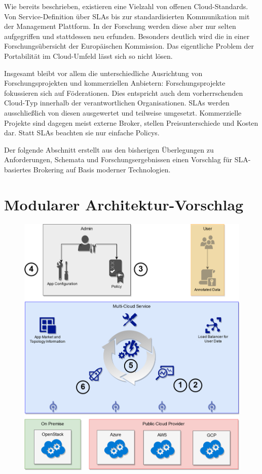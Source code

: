 Wie bereits beschrieben, existieren eine Vielzahl von offenen Cloud-Standards. Von Service-Definition über SLAs bis zur standardisierten Kommunikation mit der Management Plattform. In der Forschung werden diese aber nur selten aufgegriffen und stattdessen neu erfunden. Besonders deutlich wird die in einer Forschungsübersicht der Europäischen Kommission.
Das eigentliche Problem der Portabilität im Cloud-Umfeld lässt sich so nicht lösen.

Insgesamt bleibt vor allem die unterschiedliche Ausrichtung von Forschungsprojekten und kommerziellen Anbietern: Forschungsprojekte fokussieren sich auf Föderationen. Dies entspricht auch dem vorherrschenden Cloud-Typ innerhalb der verantwortlichen Organisationen. SLAs werden ausschließlich von diesen ausgewertet und teilweise umgesetzt. Kommerzielle Projekte sind dagegen meist externe Broker, stellen Preisunterschiede und Kosten dar. Statt SLAs beachten sie nur einfache Policys.

Der folgende Abschnitt erstellt aus den bisherigen Überlegungen zu Anforderungen, Schemata und Forschungsergebnissen einen Vorschlag für SLA-basiertes Brokering auf Basis moderner Technologien.


\section{Modularer Architektur-Vorschlag}

%
%
%

\begin{figure}
	\centering
	\includegraphics[width=0.9\linewidth]{images/cycle}
	\caption{}
	\label{fig:cycle}
\end{figure}

